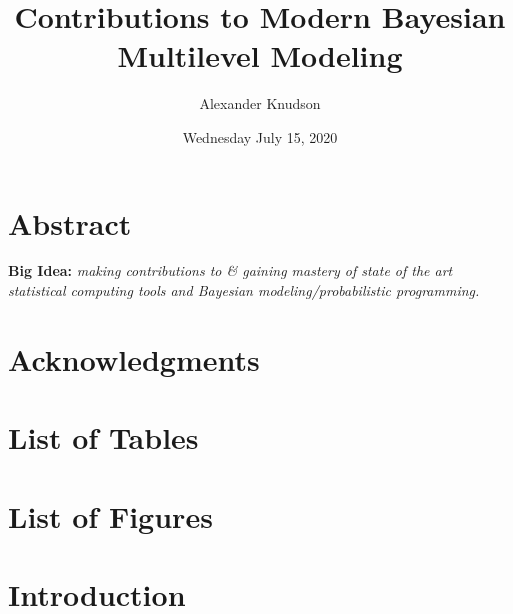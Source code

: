 \documentclass[
]{article}
\title{Contributions to Modern Bayesian Multilevel Modeling}
\author{Alexander Knudson}
\date{Wednesday July 15, 2020}
\begin{document}
\maketitle

{
\setcounter{tocdepth}{3}
\tableofcontents
}
\hypertarget{abstract}{%
\section*{Abstract}\label{abstract}}


\textbf{Big Idea:} \emph{making contributions to \& gaining mastery of state of the art statistical computing tools and Bayesian modeling/probabilistic programming.}

\hypertarget{acknowledgments}{%
\section*{Acknowledgments}\label{acknowledgments}}


\hypertarget{list-of-tables}{%
\section*{List of Tables}\label{list-of-tables}}


\hypertarget{list-of-figures}{%
\section*{List of Figures}\label{list-of-figures}}


\hypertarget{introduction}{%
\section{Introduction}\label{introduction}}
\end{document}
